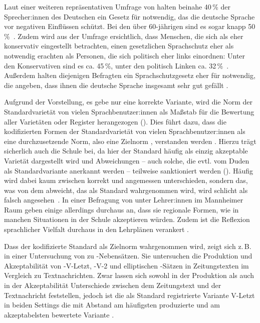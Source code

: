 Laut einer weiteren repräsentativen Umfrage von \citet{Gartig2010} halten beinahe 40\,\% der Sprecher:innen des Deutschen ein Gesetz f{\"u}r notwendig, das die deutsche Sprache vor negativen Einfl{\"u}ssen sch{\"u}tzt. 
Bei den {\"u}ber 60-j{\"a}hrigen sind es sogar knapp 50\,\%~\citep[s.][221]{Gartig2010}. 
Zudem wird aus der Umfrage ersichtlich, dass Menschen, die sich als eher konservativ eingestellt betrachten, einen gesetzlichen Sprachschutz eher als notwendig erachten als Personen, die sich politisch eher links einordnen: 
Unter den Konservativen sind es ca. 45\,\%, unter den politisch Linken ca. 32\,\%~\citep[s.][221]{Gartig2010}. 
Außerdem halten diejenigen Befragten ein Sprachschutzgesetz eher für notwendig, die angeben, dass ihnen die deutsche Sprache insgesamt sehr gut gefällt \citep[s.][222]{Gartig2010}.

Aufgrund der Vorstellung, es gebe nur eine korrekte Variante, wird die Norm der Standardvarietät  von vielen Sprachbenutzer:innen als Ma{\ss}stab f{\"u}r die Bewertung aller Variet{\"a}ten oder Register herangezogen (\cites[s.][31]{Ammon.2005}[133]{Hennig2012}). 
Dies führt dazu, dass die kodifizierten Formen der Standardvarietät von vielen Sprachbenutzer:innen als eine durchzusetzende Norm, also eine Zielnorm \citep[s.][21]{Gloy1975}, verstanden werden \citep[s.][31]{Ammon.2005}. 
Hierzu trägt sicherlich auch die Schule bei, da hier der Standard häufig als einzig akzeptable Varietät dargestellt wird und Abweichungen -- auch solche, die evtl. vom Duden als Standardvariante anerkannt werden -- teilweise sanktioniert werden (\cites[s.][42]{Topalovic2008}{Maitz2015}).
Häufig wird dabei kaum zwischen korrekt und angemessen unterschieden, sondern das, was von dem abweicht, das als Standard wahrgenommen wird, wird schlicht als falsch angesehen~\citep[s.][142]{Hennig2012}.
In einer Befragung von \citet{Davies.2000} unter Lehrer:innen im Mannheimer Raum geben einige allerdings durchaus an, dass sie regionale Formen, wie  in manchen Situationen in der Schule akzeptieren würden. Zudem ist die Reflexion sprachlicher Vielfalt durchaus in den Lehrplänen verankert \citep[s.][211]{Maitz2015}.

Dass der kodifizierte Standard als Zielnorm wahrgenommen wird, zeigt sich z.\,B. in einer Untersuchung von \citet[]{Wolfer.2020} zu -Nebensätzen.
Sie untersuchen die Produktion und Akzeptabilität von -V-Letzt, -V-2 und elliptischen -Sätzen in Zeitungstexten im Vergleich zu Textnachrichten. 
Zwar lassen sich sowohl in der Produktion als auch in der Akzeptabilität Unterschiede zwischen dem Zeitungstext und der Textnachricht feststellen, jedoch ist die als Standard registrierte Variante V-Letzt in beiden Settings die mit Abstand am häufigsten produzierte und am akzeptabelsten bewertete Variante \citep[s.][185--188]{Wolfer.2020}.
 
